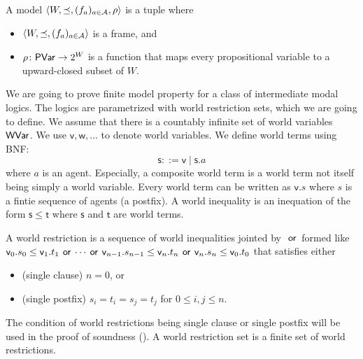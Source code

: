   \begin{definition}
   A model $\langle{W,\preceq, (f_a)_{a\in \mathcal A},\rho}\rangle$ is a tuple where
   \begin{itemize}
    \item $\langle{W,\preceq,(f_a)_{a\in \mathcal A}}\rangle$ is a frame, and
    \item $\rho\colon \mathsf{PVar}\rightarrow 2^W$ is a function that maps every
	  propositional variable to a upward-closed subset of $W\!$.
   \end{itemize}
  \end{definition}

  We are going to prove finite model property for a class of
  intermediate modal logics.  The logics are parametrized with
  world restriction sets,  which we are going to define.
  We assume that there is a countably infinite set of world variables~$\mathsf{WVar}$.
  We use $\mathsf v, \mathsf w,\ldots$ to denote world variables.
  We define world terms using BNF:
  \[
  \mathsf s::=\mathsf v\mid \mathsf s.a
  \]
  where $a$ is an agent.  Especially, a composite world term is a world
  term not itself being simply a world variable.
  Every world term can be written as $\mathsf v.s$ where $s$ is a fintie sequence
  of agents (a postfix).
  A world inequality is an inequation of the form $\mathsf s\le
  \mathsf t$ where $\mathsf s$ and $\mathsf t$ are world terms.
  \begin{definition}
   A world restriction is a sequence of world inequalities jointed
   by~$\,\mathbin{\mathsf{or}}\,$ formed like
   $\mathsf v_0.s_0\le\mathsf v_1.t_1\,\mathbin{\mathsf{or}}\,\cdots\,\mathbin{\mathsf{or}}\,
   \mathsf v_{n-1}.s_{n-1}\le\mathsf v_n.t_n\,\mathbin{\mathsf{or}}\, \mathsf v_n.s_n\le\mathsf
   v_0.t_0$ that satisfies either
   \begin{itemize}
    \item (single clause) $n=0$, or
    \item (single postfix) $s_i = t_i = s_j = t_{j}$ for $0\le i,j\le n$.
   \end{itemize}
  \end{definition}
  The condition of world restrictions being single clause or single
  postfix will be used in the proof of soundness ().
  A world restriction set is a finite set of world restrictions.

